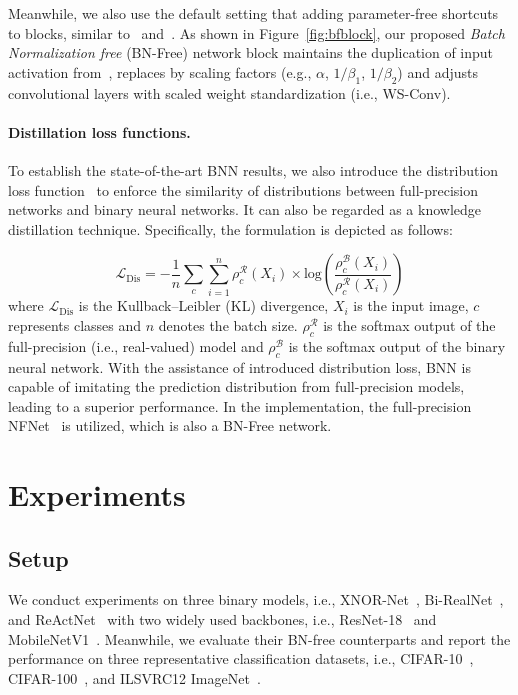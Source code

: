 \documentclass[final]{cvpr}
\begin{document}
Meanwhile, we also use the default setting that adding parameter-free shortcuts to blocks, similar to~\cite{liu2018bi} and~\cite{liu2020reactnet}. As shown in Figure~\ref{fig:bfblock}, our proposed \textit{Batch Normalization free} (BN-Free) network block maintains the duplication of input activation from~\cite{liu2020reactnet}, replaces by scaling factors (e.g., $\alpha$, $1/\beta_1$, $1/\beta_2$) and adjusts convolutional layers with scaled weight standardization (i.e., WS-Conv).





\paragraph{Distillation loss functions.} To establish the state-of-the-art BNN results, we also introduce the distribution loss function~\cite{liu2020reactnet} to enforce the similarity of distributions between full-precision networks and binary neural networks. It can also be regarded as a knowledge distillation technique. Specifically, the formulation is depicted as follows:

\begin{equation}
\mathcal{L}_{\mathrm{Dis}} = -\frac{1}{n}\sum\limits_c\sum\limits_{i=1}^{n}\rho_c^{\mathcal{R}}(X_i)\times\mathrm{log}(\frac{\rho_c^{\mathcal{B}}(X_i)}{\rho_c^{\mathcal{R}}(X_i)})  
\end{equation}
where $\mathcal{L}_{\mathrm{Dis}}$ is the Kullback–Leibler (KL) divergence, $X_i$ is the input image, $c$ represents classes and $n$ denotes the batch size. $\rho_c^{\mathcal{R}}$ is the softmax output of the full-precision (i.e., real-valued) model and $\rho_c^{\mathcal{B}}$ is the softmax output of the binary neural network. With the assistance of introduced distribution loss, BNN is capable of imitating the prediction distribution from full-precision models, leading to a superior performance. In the implementation, the full-precision NFNet~\cite{brock2021characterizing,brock2021agc} is utilized, which is also a BN-Free network.

\section{Experiments}
\subsection{Setup}\label{sec:setup}
We conduct experiments on three binary models, i.e., XNOR-Net~\cite{rastegari2016xnor}, Bi-RealNet~\cite{liu2018bi}, and ReActNet~\cite{liu2020reactnet} with two widely used backbones, i.e., ResNet-18~\cite{he2016deep} and MobileNetV1~\cite{howard2017mobilenets}. Meanwhile, we evaluate their BN-free counterparts and report the performance on three representative classification datasets, i.e., CIFAR-10~\cite{krizhevsky2009learning}, CIFAR-100~\cite{krizhevsky2009learning}, and ILSVRC12 ImageNet~\cite{russakovsky2015imagenet}. 
\end{document}
